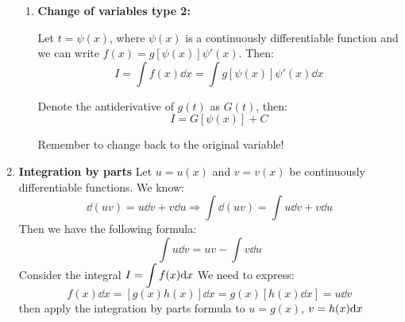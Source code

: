 \documentclass[12pt]{article}
\begin{document}
\begin{enumerate}
\begin{enumerate}
    \item \textbf{Change of variables type 2:}
    \par Let $t = \psi(x)$, where $\psi(x)$ is a continuously differentiable function and we can write $f(x) = g[\psi(x)]\psi ' (x)$. Then:
    \begin{equation*}
         I = \int f(x) \dd x = \int g[\psi(x)]\psi'(x) \dd x
    \end{equation*}
    \par Denote the antiderivative of $g(t)$ as $G(t)$, then:
    \begin{equation*}
        I = G[\psi(x)] + C
    \end{equation*}
    \begin{important}
        Remember to change back to the original variable!
    \end{important}
\end{enumerate}
    \item \textbf{Integration by parts}
    Let $u = u(x)$ and $v = v(x)$ be continuously differentiable functions. We know:
    \begin{equation*}
        \dd (uv) = u \dd v + v \dd u \Rightarrow \int \dd (uv) = \int u \dd v + v \dd u
    \end{equation*}
    Then we have the following formula:
    \begin{equation*}
        \int u \dd v = uv - \int v \dd u
    \end{equation*}
    Consider the integral $I = \mathlarger{\int f(x) \dd x}$ We need to express:
    \begin{equation*}
        f(x) \dd x = [g(x)h(x)]\dd x = g(x) [h(x) \dd x] = u \dd v
    \end{equation*}
    then apply the integration by parts formula to $u = g(x)$, $v = \mathlarger{h(x) \dd x}$
\end{enumerate}
\end{document}
